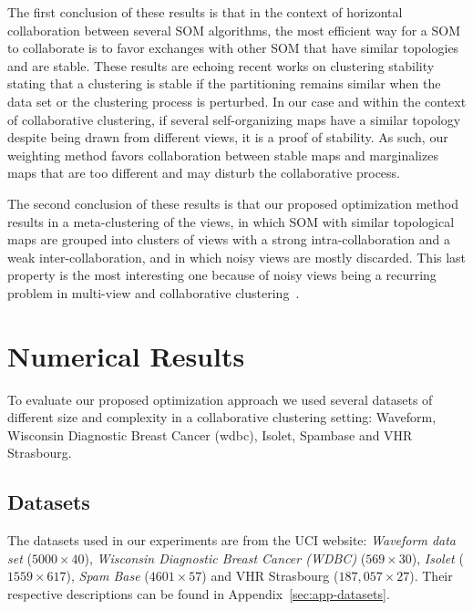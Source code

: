 The first conclusion of these results is that in the context of horizontal collaboration between several SOM algorithms, the most efficient way for a SOM to collaborate is to favor exchanges with other SOM that have similar topologies and are stable. These results are echoing recent works on clustering stability~\cite{stability2,vonLuxburg:2010:CSO:1774730.1774731} stating that  a clustering is stable if the partitioning remains similar when the data set or the clustering process is perturbed. 
In our case and within the context of collaborative clustering, if several self-organizing maps have a similar topology despite being drawn from different views, it is a proof of stability. As such, our weighting method favors collaboration between stable maps and marginalizes maps that are too different and may disturb the collaborative process.


The second conclusion of these results is that our proposed optimization method results in a meta-clustering of the views, in which SOM with similar topological maps are grouped into clusters of views with a strong intra-collaboration and a weak inter-collaboration, and in which noisy views are mostly discarded. This last property is the most interesting one because of noisy views being a recurring problem in multi-view and collaborative clustering~\cite{Cornuejols201881}.





\section{Numerical Results} 
\label{app:c}

To evaluate our proposed optimization approach we used several datasets of different size and complexity in a collaborative clustering setting: Waveform, Wisconsin Diagnostic Breast Cancer (wdbc), Isolet, Spambase and VHR Strasbourg.

\subsection{Datasets}
The datasets used in our experiments are from the UCI website: \textit{Waveform data set} ($5000 \times 40$), \textit{Wisconsin Diagnostic Breast Cancer (WDBC)} ($569 \times 30$), \textit{Isolet} ($1559 \times 617$), \textit{Spam Base} ($4601 \times 57$) and VHR Strasbourg ($187,057 \times 27$). Their respective descriptions can be found in Appendix~\ref{sec:app-datasets}.\\


